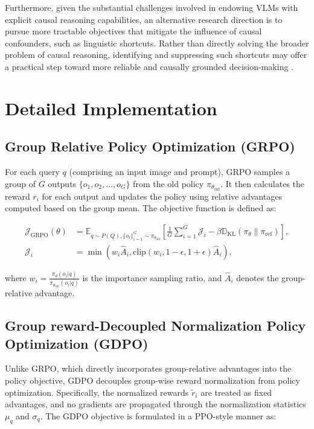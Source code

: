 \documentclass{article}
\begin{document}
Furthermore, given the substantial challenges involved in endowing VLMs with explicit causal reasoning capabilities, an alternative research direction is to pursue more tractable objectives that mitigate the influence of causal confounders, such as linguistic shortcuts. Rather than directly solving the broader problem of causal reasoning, identifying and suppressing such shortcuts may offer a practical step toward more reliable and causally grounded decision-making \cite{causal:e2e:causalvad, causal:e2e:cadet, causal:e2e:decoupling_perception_and_ego_status}.  



\section{Detailed Implementation}
\label{appendix:implementations}
\subsection{Group Relative Policy Optimization (GRPO)}
\label{appendix:implementations_grpo}
For each query $q$ (comprising an input image and prompt), GRPO samples a group of $G$ outputs $\{o_1, o_2, \dots, o_G\}$ from the old policy $\pi_{\theta_{\text{old}}}$. It then calculates the reward $r_i$ for each output and updates the policy using relative advantages computed based on the group mean. The objective function is defined as:

$$\begin{aligned}
\mathcal{J}_{\mathrm{GRPO}}(\theta) &= \mathbb{E}_{q \sim P(Q), \{o_i\}_{i=1}^G \sim \pi_{\theta_{\text{old}}}} \left[ \frac{1}{G} \sum_{i=1}^G \mathcal{J}_i - \beta \mathbb{D}_{\mathrm{KL}}(\pi_\theta \| \pi_{\text{ref}}) \right], \\
\mathcal{J}_i &= \min \left( w_i \hat{A}_i, \text{clip}(w_i, 1-\epsilon, 1+\epsilon) \hat{A}_i \right),
\end{aligned}$$

where $w_i = \frac{\pi_\theta(o_i|q)}{\pi_{\theta_{\text{old}}}(o_i|q)}$ is the importance sampling ratio, and $\hat{A}_i$ denotes the group-relative advantage.

\subsection{Group reward-Decoupled Normalization Policy Optimization (GDPO)}
\label{appendix:implementations_gdpo}
Unlike GRPO, which directly incorporates group-relative advantages into the policy objective, GDPO decouples group-wise reward normalization from policy optimization. Specifically, the normalized rewards $\tilde{r}_i$ are treated as fixed advantages, and no gradients are propagated through the normalization statistics $\mu_q$ and $\sigma_q$. The GDPO objective is formulated in a PPO-style manner as:
\end{document}

